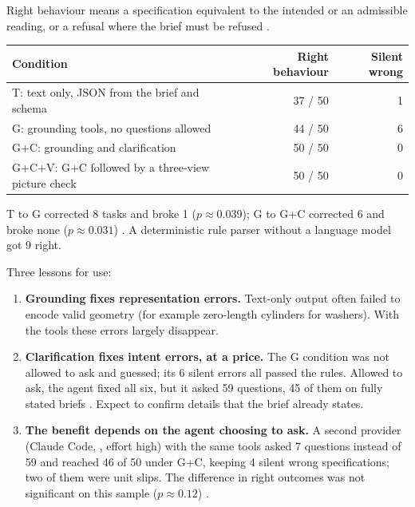 \begin{evidencebox}
Right behaviour means a specification equivalent to the intended or an admissible reading, or a refusal where the
brief must be refused .

\smallskip
{\centering\sffamily\footnotesize
\begin{tabular}{@{}lrr@{}}
\toprule
Condition & Right behaviour & Silent wrong \\ \midrule
T: text only, JSON from the brief and schema & 37 / 50 & 1 \\
G: grounding tools, no questions allowed & 44 / 50 & 6 \\
G+C: grounding and clarification & 50 / 50 & 0 \\
G+C+V: G+C followed by a three-view picture check & 50 / 50 & 0 \\
\bottomrule
\end{tabular}\par}

\smallskip
T to G corrected 8 tasks and broke 1 ($p \approx 0.039$); G to G+C corrected 6 and broke none ($p \approx 0.031$)
. A deterministic rule parser without a language model got 9 right.
\end{evidencebox}

Three lessons for use:
\begin{enumerate}
  \item \textbf{Grounding fixes representation errors.} Text-only output often failed to encode valid geometry (for
  example zero-length cylinders for washers). With the tools these errors largely disappear.
  \item \textbf{Clarification fixes intent errors, at a price.} The G condition was not allowed to ask and guessed; its
  6 silent errors all passed the rules. Allowed to ask, the agent fixed all six, but it asked 59 questions, 45 of them on
  fully stated briefs . Expect to confirm details that the brief already states.
  \item \textbf{The benefit depends on the agent choosing to ask.} A second provider (Claude Code, ,
  effort high) with the same tools asked 7 questions instead of 59 and reached 46 of 50 under G+C, keeping 4 silent
  wrong specifications; two of them were unit slips. The difference in right outcomes was not significant on this sample
  ($p \approx 0.12$) .
\end{enumerate}

